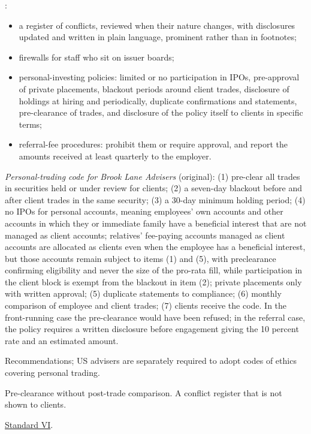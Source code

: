 \begin{qfmethod}\label{meth:preventing-conflict-violations}
 \citep[pp.~157--160, 165--167, 169]{standards-practice-handbook-2024}:
\begin{itemize}
\item a register of conflicts, reviewed when their nature changes, with disclosures updated and written in plain language, prominent rather than in footnotes;
\item firewalls for staff who sit on issuer boards;
\item personal-investing policies: limited or no participation in IPOs, pre-approval of private placements, blackout periods around client trades, disclosure of holdings at hiring and periodically, duplicate confirmations and statements, pre-clearance of trades, and disclosure of the policy itself to clients in specific terms;
\item referral-fee procedures: prohibit them or require approval, and report the amounts received at least quarterly to the employer.
\end{itemize}

 \emph{Personal-trading code for Brook Lane Advisers} (original): (1) pre-clear all trades in securities held or under review for clients; (2) a seven-day blackout before and after client trades in the same security; (3) a 30-day minimum holding period; (4) no IPOs for personal accounts, meaning employees' own accounts and other accounts in which they or immediate family have a beneficial interest that are not managed as client accounts; relatives' fee-paying accounts managed as client accounts are allocated as clients even when the employee has a beneficial interest, but those accounts remain subject to items (1) and (5), with preclearance confirming eligibility and never the size of the pro-rata fill, while participation in the client block is exempt from the blackout in item (2); private placements only with written approval; (5) duplicate statements to compliance; (6) monthly comparison of employee and client trades; (7) clients receive the code. In the front-running case the pre-clearance would have been refused; in the referral case, the policy requires a written disclosure before engagement giving the 10 percent rate and an estimated amount.

 Recommendations; US advisers are separately required to adopt codes of ethics covering personal trading.

 Pre-clearance without post-trade comparison. A conflict register that is not shown to clients.

 \hyperref[rule:standard-conflicts-of-interest]{Standard VI}.

\end{qfmethod}

